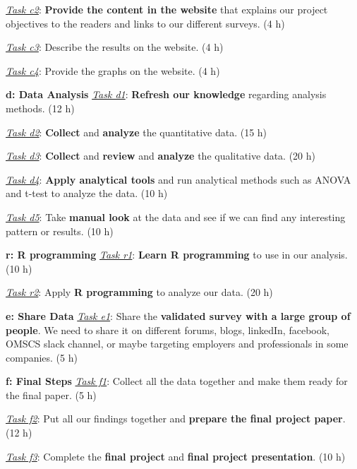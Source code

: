 \documentclass{sigchi}
\begin{document}
\textit{\underline{Task c2}}: \textbf{Provide the content in the website} that explains our project objectives to the readers and links to our different surveys. (4 h)

\textit{\underline{Task c3}}:  Describe the results on the website. (4 h)

\textit{\underline{Task c4}}: Provide the graphs on the website. (4 h)\newline

\textbf{d: Data Analysis}\newline
\textit{\underline{Task d1}}: \textbf{Refresh our knowledge} regarding analysis methods. (12 h)

\textit{\underline{Task d2}}: \textbf{Collect} and \textbf{analyze} the quantitative data. (15 h)

\textit{\underline{Task d3}}: \textbf{Collect} and  \textbf{review} and \textbf{analyze} the qualitative data. (20 h)

\textit{\underline{Task d4}}: \textbf{Apply analytical tools} and run analytical methods such as ANOVA and t-test to analyze the data. (10 h)

\textit{\underline{Task d5}}: Take \textbf{manual look} at the data and see if we can find any interesting pattern or results. (10 h)\newline

\textbf{r: R programming}\newline
\textit{\underline{Task r1}}: \textbf{Learn R programming} to use in our analysis. (10 h)

\textit{\underline{Task r2}}: Apply \textbf{R programming} to analyze our data. (20 h)\newline

\textbf{e: Share Data}\newline
\textit{\underline{Task e1}}: Share the \textbf{validated survey with a large group of people}. We need to share it on different forums, blogs, linkedIn, facebook, OMSCS slack channel, or maybe targeting employers and professionals in some companies. (5 h)\newline

\textbf{f: Final Steps}\newline
\textit{\underline{Task f1}}: Collect all the data together and make them ready for the final paper. (5 h)

\textit{\underline{Task f2}}: Put all our findings together and \textbf{prepare the final project paper}. (12 h)

\textit{\underline{Task f3}}: Complete the \textbf{final project} and \textbf{final project presentation}.  (10 h)\newline
\end{document}
